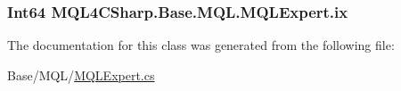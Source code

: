 \subsubsection[{\texorpdfstring{ix}{ix}}]{\setlength{\rightskip}{0pt plus 5cm}Int64 M\+Q\+L4\+C\+Sharp.\+Base.\+M\+Q\+L.\+M\+Q\+L\+Expert.\+ix}\hypertarget{class_m_q_l4_c_sharp_1_1_base_1_1_m_q_l_1_1_m_q_l_expert_a98b5a835bb18c023f5160275efa74619}{}\label{class_m_q_l4_c_sharp_1_1_base_1_1_m_q_l_1_1_m_q_l_expert_a98b5a835bb18c023f5160275efa74619}


The documentation for this class was generated from the following file\+:\begin{DoxyCompactItemize}
\item 
Base/\+M\+Q\+L/\hyperlink{_m_q_l_expert_8cs}{M\+Q\+L\+Expert.\+cs}\end{DoxyCompactItemize}
